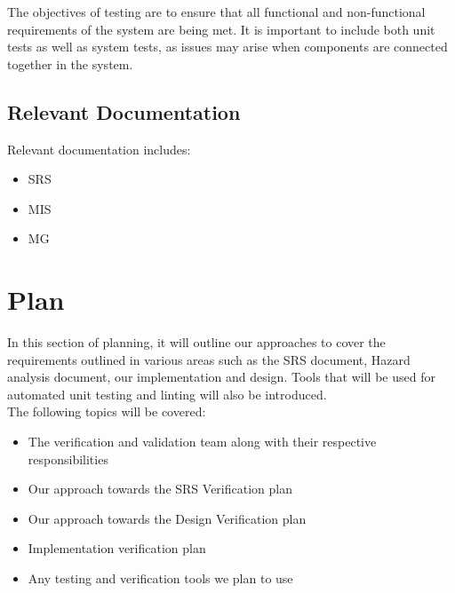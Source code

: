 \documentclass[12pt, titlepage]{article}
\begin{document}
The objectives of testing are to ensure that all functional and non-functional requirements of the system are being met. It is important to include both unit tests as well as system tests, as issues may arise when components are connected together in the system. 

\subsection{Relevant Documentation}

Relevant documentation includes:
\begin{itemize}
  \item SRS
  \item MIS
  \item MG
\end{itemize}

\section{Plan}


  In this section of planning, it will outline our approaches to cover the requirements 
  outlined in various areas such as the SRS document, Hazard analysis document, our implementation and design. 
  Tools that will be used for automated unit testing and linting will also be introduced.\\

  The following topics will be covered:

  \begin{itemize}
    \item The verification and validation team along with their respective responsibilities
    \item Our approach towards the SRS Verification plan
    \item Our approach towards the Design Verification plan
    \item Implementation verification plan
    \item Any testing and verification tools we plan to use
  \end{itemize}
\end{document}
